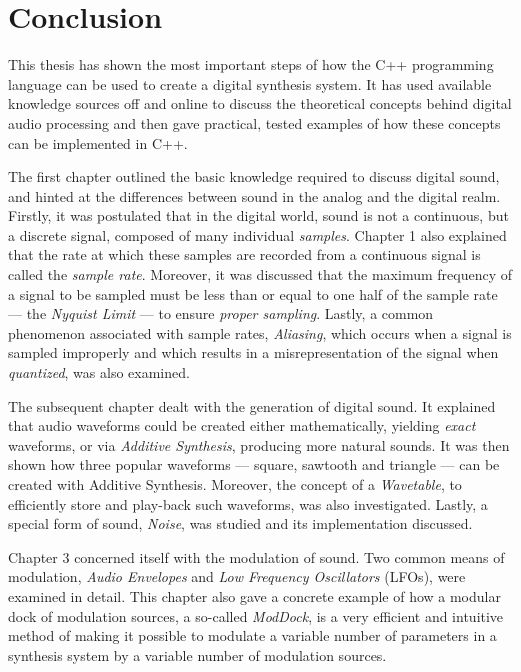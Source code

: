 \chapter*{Conclusion}

This thesis has shown the most important steps of how the C++ programming language can be used to create a digital synthesis system. It has used available knowledge sources off and online to discuss the theoretical concepts behind digital audio processing and then gave practical, tested examples of how these concepts can be implemented in C++. \parbreak

The first chapter outlined the basic knowledge required to discuss digital sound, and hinted at the differences between sound in the analog and the digital realm. Firstly, it was postulated that in the digital world, sound is not a continuous, but a discrete signal, composed of many individual \emph{samples}. Chapter 1 also explained that the rate at which these samples are recorded from a continuous signal is called the \emph{sample rate}. Moreover, it was discussed that the maximum frequency of a signal to be sampled must be less than or equal to one half of the sample rate --- the \emph{Nyquist Limit} --- to ensure \emph{proper sampling}. Lastly, a common phenomenon associated with sample rates, \emph{Aliasing}, which occurs when a signal is sampled improperly and which results in a misrepresentation of the signal when \emph{quantized}, was also examined. \parbreak

The subsequent chapter dealt with the generation of digital sound. It explained that audio waveforms could be created either mathematically, yielding \emph{exact} waveforms, or via \emph{Additive Synthesis}, producing more natural sounds. It was then shown how three popular waveforms --- square, sawtooth and triangle --- can be created with Additive Synthesis. Moreover, the concept of a \emph{Wavetable}, to efficiently store and play-back such waveforms, was also investigated. Lastly, a special form of sound, \emph{Noise}, was studied and its implementation discussed. \parbreak

Chapter 3 concerned itself with the modulation of sound. Two common means of modulation, \emph{Audio Envelopes} and \emph{Low Frequency Oscillators} (LFOs), were examined in detail. This chapter also gave a concrete example of how a modular dock of modulation sources, a so-called \emph{ModDock}, is a very efficient and intuitive method of making it possible to modulate a variable number of parameters in a synthesis system by a variable number of modulation sources. \parbreak

